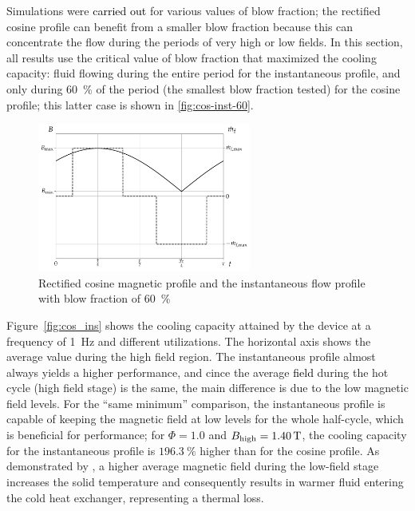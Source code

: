 \documentclass[referee]{svjour3}
\begin{document}
Simulations were \textcolor{black}{carried out} for various values of blow fraction; the rectified cosine profile can benefit from a smaller blow fraction because this can concentrate the flow during the periods of very high or low fields. In this section, all results use the critical value of blow fraction that maximized the cooling capacity: fluid flowing during the entire period for the instantaneous profile, and only during \SI{60}{\percent}  of the period (the smallest blow fraction tested) for the cosine profile; this latter case is shown in \autoref{fig:cos-inst-60}.

\begin{figure}[!ht]
  \centering
  \includegraphics[width=7cm]{profiles_rc_and_flow_instantaneous}
  \caption{Rectified cosine magnetic profile and the instantaneous flow profile with blow fraction of \SI{60}{\percent}}
  \label{fig:cos-inst-60}
\end{figure}

Figure~\ref{fig:cos_ins} shows the cooling capacity attained by the device at a frequency of \SI{1}{\hertz} and different utilizations. The horizontal axis shows the average value during the high field region. The instantaneous profile almost always yields a higher performance, and cince the average \textcolor{black}{field} during the hot cycle (high field stage) is the same, the main difference is due to the low magnetic field levels. For the ``same minimum'' comparison, the instantaneous profile is capable of keeping the magnetic field at low levels for the whole half-cycle, which is beneficial for performance;  for $\Phi=1.0$ and $B_{\mathrm{high}} = \SI{1.40}{\tesla}$, the cooling capacity for the instantaneous profile is $\SI{196.3}{\percent}$ higher than for the cosine profile.  As demonstrated by \cite{bib:asme-mce}, a higher average magnetic field during the low-field stage increases the solid temperature and consequently results in  warmer fluid entering the cold heat exchanger, representing a thermal loss. 
\end{document}
